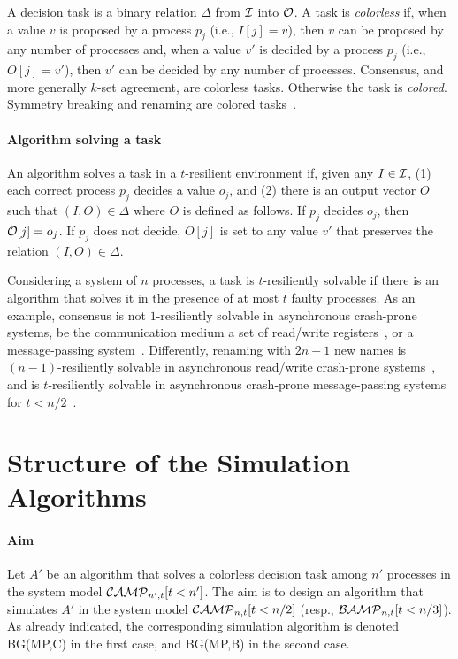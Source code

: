 \documentclass[11pt,letterpaper]{article}
\newcommand{\CM}{{\cal CAMP}_{n,t}}
\newcommand{\CMprim}{{\cal CAMP}_{n',t}}
\newcommand{\BM}{{\cal BAMP}_{n,t}}
\begin{document}
A decision task is a binary relation $\Delta$ from ${\cal I}$ into ${\cal O}$.
A task is {\it colorless} if,  
when a value  $v$ is proposed by a process
$p_j$ (i.e., $I[j]=v$), then $v$ can be proposed by any number of processes and,
when a value  $v'$ is decided by a process
$p_j$ (i.e., $O[j]=v'$), then $v'$ can be decided by any number of processes.
Consensus, and more generally $k$-set agreement, are colorless tasks.
Otherwise the task is  {\it colored}.  Symmetry breaking and renaming are
colored tasks~\cite{ABDPR90,CRR11,IRR11}.


\paragraph{Algorithm solving a task}
An algorithm solves a task in a $t$-resilient  environment if, given
any $I\in {\cal I}$, (1)  each correct process $p_j$  decides a value $o_j$,
 and (2) there is an output vector $O$ such that
$(I,O)\in \Delta$ where $O$ is defined as follows.
If $p_j$ decides $o_j$, then  ${\cal O}[j]=o_j$.
If $p_j$ does not decide, $O[j]$ is set to any  value $v'$ that preserves
the relation $(I,O)\in \Delta$.


Considering a system of $n$ processes, a
task  is  $t$-resiliently solvable if there is  an
algorithm that solves  it in the presence of at most $t$ faulty processes.
As an example, consensus is  not  $1$-resiliently solvable
in asynchronous crash-prone systems, be the communication medium a set of
read/write registers~\cite{LA87}, or a message-passing  system~\cite{FLP85}.
Differently,  renaming  with $2n-1$ new names is $(n-1)$-resiliently solvable
in asynchronous read/write crash-prone systems~\cite{CR12,HS99}, and
is $t$-resiliently solvable in asynchronous crash-prone message-passing
systems for $t<n/2$~\cite{ABDPR90}.




\section{Structure of the Simulation Algorithms}
\label{sec:simu-structure}

\paragraph{Aim}
Let $A'$ be an algorithm that solves a colorless decision task among $n'$
processes in the  system model  $\CMprim[t<n']$. The aim is to design an algorithm that simulates $A'$ in the
system model  $\CM[t<n/2]$  (resp.,  $\BM[t<n/3]$).
As already indicated, the corresponding simulation algorithm is denoted
BG(MP,C) in the first case, and BG(MP,B) in the second case.
\end{document}
